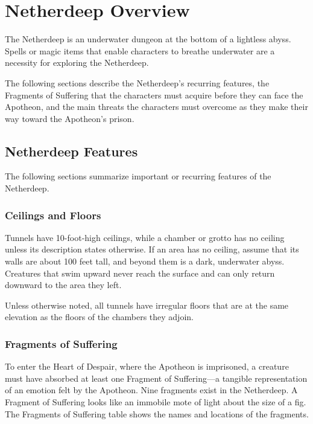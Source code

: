 \documentclass[letterpaper, 11pt, bg=full, twocolumn]{dndbook}
\begin{document}
\section{Netherdeep Overview}

The Netherdeep is an underwater dungeon at the bottom of a lightless abyss. Spells or magic items that enable characters to breathe underwater are a necessity for exploring the Netherdeep.

The following sections describe the Netherdeep's recurring features, the Fragments of Suffering that the characters must acquire before they can face the Apotheon, and the main threats the characters must overcome as they make their way toward the Apotheon's prison.



\subsection{Netherdeep Features}

The following sections summarize important or recurring features of the Netherdeep.

\subsubsection{Ceilings and Floors}

Tunnels have 10-foot-high ceilings, while a chamber or grotto has no ceiling unless its description states otherwise. If an area has no ceiling, assume that its walls are about 100 feet tall, and beyond them is a dark, underwater abyss. Creatures that swim upward never reach the surface and can only return downward to the area they left.

Unless otherwise noted, all tunnels have irregular floors that are at the same elevation as the floors of the chambers they adjoin.

\subsubsection{Fragments of Suffering}

To enter the Heart of Despair, where the Apotheon is imprisoned, a creature must have absorbed at least one Fragment of Suffering---a tangible representation of an emotion felt by the Apotheon. Nine fragments exist in the Netherdeep. A Fragment of Suffering looks like an immobile mote of light about the size of a fig. The Fragments of Suffering table shows the names and locations of the fragments.
\end{document}
